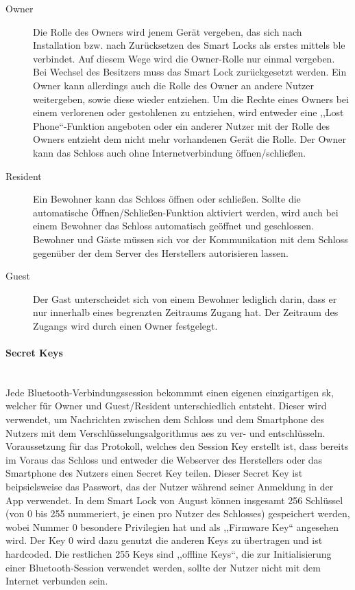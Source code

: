 		\begin{description}
		    \item [Owner] Die Rolle des Owners wird jenem Gerät vergeben, das sich nach Installation bzw. nach Zurücksetzen des Smart Locks als erstes mittels \gls{ble} verbindet. 
   		        Auf diesem Wege wird die Owner-Rolle nur einmal vergeben. 
   		        Bei Wechsel des Besitzers muss das Smart Lock zurückgesetzt werden. 
   		        Ein Owner kann allerdings auch die Rolle des Owner an andere Nutzer weitergeben, sowie diese wieder entziehen. 
   		        Um die Rechte eines Owners bei einem verlorenen oder gestohlenen zu entziehen, wird entweder eine ,,Lost Phone``-Funktion angeboten oder ein anderer Nutzer mit der Rolle des Owners entzieht dem nicht mehr vorhandenen Gerät die Rolle. 
   		        Der Owner kann das Schloss auch ohne Internetverbindung öffnen/schließen. 
   	        \item [Resident] Ein Bewohner kann das Schloss öffnen oder schließen. 
   	            Sollte die automatische Öffnen/Schließen-Funktion aktiviert werden, wird auch bei einem Bewohner das Schloss automatisch geöffnet und geschlossen. 
   	            Bewohner und Gäste müssen sich vor der Kommunikation mit dem Schloss gegenüber der dem Server des Herstellers autorisieren lassen.
   	        \item [Guest] Der Gast unterscheidet sich von einem Bewohner lediglich darin, dass er nur innerhalb eines begrenzten Zeitraums Zugang hat. 
                Der Zeitraum des Zugangs wird durch einen Owner festgelegt.
		\end{description}
        
		\paragraph{Secret Keys}\hspace{0pt}\smallskip\\
		Jede Bluetooth-Verbindungssession bekommmt einen eigenen einzigartigen \gls{sk}, welcher für Owner und Guest/Resident unterschiedlich entsteht.
		Dieser wird verwendet, um Nachrichten zwischen dem Schloss und dem Smartphone des Nutzers mit dem Verschlüsselungsalgorithmus \gls{aes} zu ver- und entschlüsseln. 
		Voraussetzung für das Protokoll, welches den Session Key erstellt ist, dass bereits im Voraus das Schloss und entweder die Webserver des Herstellers oder das Smartphone des Nutzers einen Secret Key teilen. 
		Dieser Secret Key ist beipsielsweise das Passwort, das der Nutzer während seiner Anmeldung in der App verwendet. 
		In dem Smart Lock von August können insgesamt 256 Schlüssel (von 0 bis 255 nummeriert, je einen pro Nutzer des Schlosses) gespeichert werden, wobei Nummer 0 besondere Privilegien hat und als ,,Firmware Key`` angesehen wird.\cite{Jmaxxz2016,Fuller2017} 
		Der Key 0 wird dazu genutzt die anderen Keys zu übertragen und ist hardcoded. 
        Die restlichen 255 Keys sind ,,offline Keys``, die zur Initialisierung einer Bluetooth-Session verwendet werden, sollte der Nutzer nicht mit dem Internet verbunden sein.\cite{Fuller2017}
        
